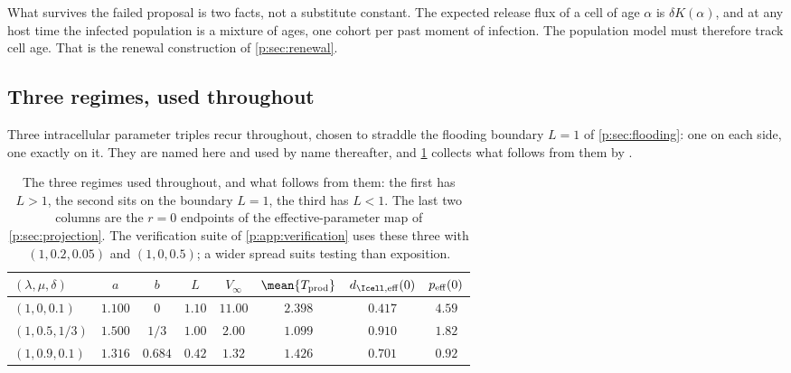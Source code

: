 What survives the failed proposal is two facts, not a substitute constant.
The expected release flux of a cell of age $\alpha$ is $\delta K(\alpha)$,
and at any host time the infected population is a mixture of ages, one
cohort per past moment of infection. The population model must therefore
track cell age. That is the renewal construction of
\cref{p:sec:renewal}.

\subsection{Three regimes, used throughout}
\label{p:sec:trio}

Three intracellular parameter triples recur throughout, chosen to straddle
the flooding boundary $L=1$ of \cref{p:sec:flooding}: one on each side, one
exactly on it. They are named here and used by name thereafter, and
\cref{p:tab:trio} collects what follows from them by
.

\begin{table}[htbp]
\centering
\renewcommand{\arraystretch}{1.12}
\small
\begin{tabular}{@{}lccccccc@{}}
\toprule
$(\lambda,\mu,\delta)$ & $a$ & $b$ & $L$ & $V_\infty$
 & $\mean{T_{\rm prod}}$ & $d_{\Icell,{\rm eff}}(0)$ & $p_{\rm eff}(0)$ \\
\midrule
$(1,0,0.1)$    & $1.100$ & $0$     & $1.10$ & $11.00$ & $2.398$ & $0.417$ & $4.59$ \\
$(1,0.5,1/3)$  & $1.500$ & $1/3$   & $1.00$ & $2.00$  & $1.099$ & $0.910$ & $1.82$ \\
$(1,0.9,0.1)$  & $1.316$ & $0.684$ & $0.42$ & $1.32$  & $1.426$ & $0.701$ & $0.92$ \\
\bottomrule
\end{tabular}
\caption{The three regimes used throughout, and what follows from them: the
first has $L>1$, the second sits on the boundary $L=1$, the third has $L<1$.
The last two columns are the $r=0$ endpoints of the effective-parameter map
of \cref{p:sec:projection}. The verification suite of
\cref{p:app:verification} uses these three with $(1,0.2,0.05)$ and
$(1,0,0.5)$; a wider spread suits testing than exposition.}
\label{p:tab:trio}
\end{table}

\FloatBarrier
